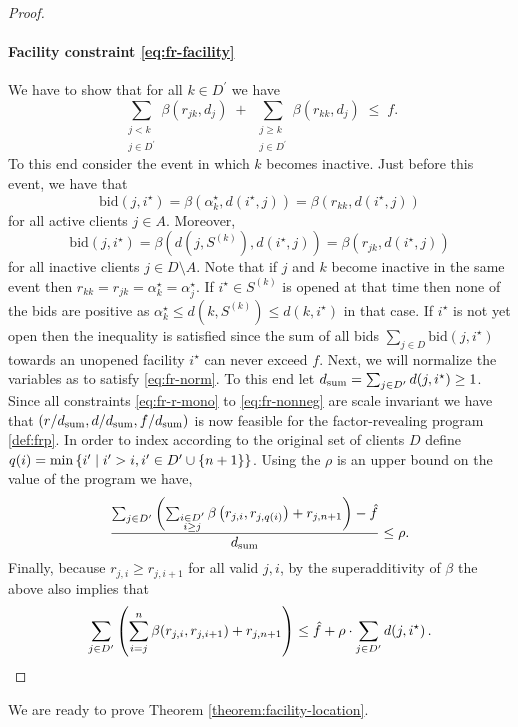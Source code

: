 \begin{proof}
\paragraph{Facility constraint \eqref{eq:fr-facility}} We have to show that for all $k \in D^\prime$ we have
\[
    \sum_{\substack{j < k \\ j \in D^\prime}} \beta(r_{jk},d_j)
  \;+\;
  \sum_{\substack{j \ge k \\ j \in D^\prime}} \beta(r_{kk},d_j)
  \;\le\; f.
\]
To this end consider the event in which $k$ becomes inactive. Just before this event, we have that 
\[
    \text{bid}(j,i^\star) = \beta(\alpha^\star_k ,d(i^\star,j)) = \beta(r_{kk},d(i^\star,j))
\] 
for all active clients $j \in A$. Moreover, 
\[
    \text{bid}(j,i^\star) = \beta(d(j,S^{(k)}),d(i^\star,j)) = \beta(r_{jk},d(i^\star,j))
\]
 for all inactive clients $j \in D \setminus A$. Note that if $j$ and $k$ become inactive in the same event then $r_{kk} = r_{jk} = \alpha^\star_k = \alpha^\star_j$. If $i^\star \in S^{(k)}$ is opened at that time then none of the bids are positive as $\alpha^\star_k \le d(k,S^{(k)}) \le d(k,i^\star)$ in that case. If $i^\star$ is not yet open then the inequality is satisfied since the sum of all bids $\sum_{j \in D} \text{bid}(j,i^\star)$ towards an unopened facility $i^\star$ can never exceed $f$. 
\newline
\newline
 Next, we will normalize the variables as to satisfy \eqref{eq:fr-norm}. To this end let $d_{\mathrm{sum}} = \sum_{j \in D^\prime} d(j, i^\star) \ge 1$. Since all constraints \eqref{eq:fr-r-mono} to \eqref{eq:fr-nonneg} are scale invariant we have that $(r/d_{\mathrm{sum}}, d/d_{\mathrm{sum}}, f/d_{\mathrm{sum}})$ is now feasible for the factor-revealing program \ref{def:frp}. In order to index according to the original set of clients $D$ define $q(i) = \min \left\{i' \mid i' > i, i' \in D^\prime \cup \{n+1\}\right\}$. Using the $\rho$ is an upper bound on the value of the program we have,
\[
    \frac{\sum_{j \in D^\prime} \left(\sum_{\substack{i \in D^\prime\\i \geq j}} \beta\left(r_{j,i}, r_{j,q(i)}\right) + r_{j,n+1}\right) - \hat{f}}{d_{\mathrm{sum}}} \le \rho.
\]
Finally, because $r_{j,i} \geq r_{j,i+1}$ for all valid $j,i$, by the superadditivity of $\beta$ the above also implies that
\[\sum_{j \in D^\prime} \left(\sum_{i=j}^n \beta(r_{j,i}, r_{j,i+1}) + r_{j,n+1}\right) \leq \hat{f} + \rho \cdot \sum_{j \in D^\prime} d(j, i^\star)\,.\]
\end{proof}
We are ready to prove Theorem \ref{theorem:facility-location}.
